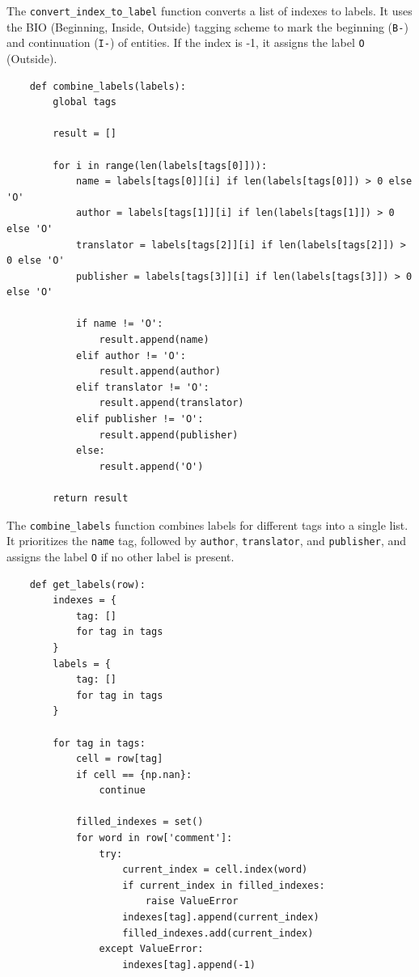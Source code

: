 \documentclass{solutionclass} %
\begin{document}
\begin{solution}
    The \texttt{convert\_index\_to\_label} function converts a list of indexes to labels. It uses the BIO (Beginning, Inside, Outside) tagging scheme to mark the beginning (\texttt{B-}) and continuation (\texttt{I-}) of entities. If the index is -1, it assigns the label \texttt{O} (Outside).
    
    \begin{lstlisting}
    def combine_labels(labels):
        global tags
    
        result = []
    
        for i in range(len(labels[tags[0]])):
            name = labels[tags[0]][i] if len(labels[tags[0]]) > 0 else 'O'
            author = labels[tags[1]][i] if len(labels[tags[1]]) > 0 else 'O'
            translator = labels[tags[2]][i] if len(labels[tags[2]]) > 0 else 'O'
            publisher = labels[tags[3]][i] if len(labels[tags[3]]) > 0 else 'O'
    
            if name != 'O':
                result.append(name)
            elif author != 'O':
                result.append(author)
            elif translator != 'O':
                result.append(translator)
            elif publisher != 'O':
                result.append(publisher)
            else:
                result.append('O')
    
        return result
    \end{lstlisting}
    
    The \texttt{combine\_labels} function combines labels for different tags into a single list. It prioritizes the \texttt{name} tag, followed by \texttt{author}, \texttt{translator}, and \texttt{publisher}, and assigns the label \texttt{O} if no other label is present.
    
    \begin{lstlisting}
    def get_labels(row):
        indexes = {
            tag: []
            for tag in tags
        }
        labels = {
            tag: []
            for tag in tags
        }
    
        for tag in tags:
            cell = row[tag]
            if cell == {np.nan}:
                continue
    
            filled_indexes = set()
            for word in row['comment']:
                try:
                    current_index = cell.index(word)
                    if current_index in filled_indexes:
                        raise ValueError
                    indexes[tag].append(current_index)
                    filled_indexes.add(current_index)
                except ValueError:
                    indexes[tag].append(-1)
    

\end{lstlisting}
\end{solution}
\end{document}
